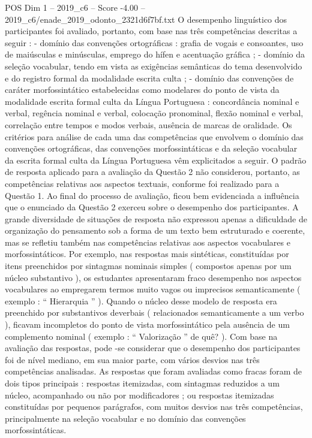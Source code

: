 \begin{textsample}{POS Dim 1 – 2019\_c6 – Score -4.00 – 2019\_c6/enade\_2019\_odonto\_2321d6f7bf.txt}
O desempenho linguístico dos participantes foi avaliado, portanto, com base nas três competências descritas a seguir : - domínio das convenções ortográficas : grafia de vogais e consoantes, uso de maiúsculas e minúsculas, emprego do hífen e acentuação gráfica ; - domínio da seleção vocabular, tendo em vista as exigências semânticas do tema desenvolvido e do registro formal da modalidade escrita culta ; - domínio das convenções de caráter morfossintático estabelecidas como modelares do ponto de vista da modalidade escrita formal culta da Língua Portuguesa : concordância nominal e verbal, regência nominal e verbal, colocação pronominal, flexão nominal e verbal, correlação entre tempos e modos verbais, ausência de marcas de oralidade.
Os critérios para análise de cada uma das competências que envolvem o domínio das convenções ortográficas, das convenções morfossintáticas e da seleção vocabular da escrita formal culta da Língua Portuguesa vêm explicitados a seguir.
O padrão de resposta aplicado para a avaliação da Questão 2 não considerou, portanto, as competências relativas aos aspectos textuais, conforme foi realizado para a Questão 1.
Ao final do processo de avaliação, ficou bem evidenciada a influência que o enunciado da Questão 2 exerceu sobre o desempenho dos participantes.
A grande diversidade de situações de resposta não expressou apenas a dificuldade de organização do pensamento sob a forma de um texto bem estruturado e coerente, mas se refletiu também nas competências relativas aos aspectos vocabulares e morfossintáticos.
Por exemplo, nas respostas mais sintéticas, constituídas por itens preenchidos por sintagmas nominais simples ( compostos apenas por um núcleo substantivo ), os estudantes apresentaram fraco desempenho nos aspectos vocabulares ao empregarem termos muito vagos ou imprecisos semanticamente ( exemplo : “ Hierarquia ” ).
Quando o núcleo desse modelo de resposta era preenchido por substantivos deverbais ( relacionados semanticamente a um verbo ), ficavam incompletos do ponto de vista morfossintático pela ausência de um complemento nominal ( exemplo : “ Valorização ” de quê? ).
Com base na avaliação das respostas, pode -se considerar que o desempenho dos participantes foi de nível mediano, em sua maior parte, com vários desvios nas três competências analisadas.
As respostas que foram avaliadas como fracas foram de dois tipos principais : respostas itemizadas, com sintagmas reduzidos a um núcleo, acompanhado ou não por modificadores ; ou respostas itemizadas constituídas por pequenos parágrafos, com muitos desvios nas três competências, principalmente na seleção vocabular e no domínio das convenções morfossintáticas.

\end{textsample}
